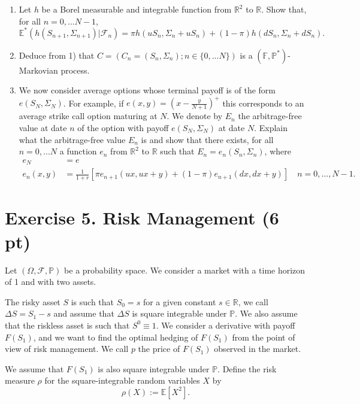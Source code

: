 \documentclass{article}
\begin{document}
\begin{enumerate}
    \item Let $h$ be a Borel measurable and integrable function from $\mathbb{R}^{2}$ to $\mathbb{R}$. Show that, for all $n=0,...N-1$,
    \[ \mathbb{E}^{*}(h(S_{n+1},\Sigma_{n+1})|\mathcal{F}_{n})=\pi h(uS_{n},\Sigma_{n}+uS_{n})+(1-\pi)h(dS_{n},\Sigma_{n}+dS_{n}). \]
    \item Deduce from 1) that $C=(C_{n}=(S_{n},\Sigma_{n});n\in\{0,...N\})$ is a $(\mathbb{F}, \mathbb{P}^{*})$-Markovian process.
    \item We now consider average options whose terminal payoff is of the form $e(S_{N},\Sigma_{N})$. For example, if $e(x,y)=(x-\frac{y}{N+1})^{+}$ this corresponds to an average strike call option maturing at $N$. We denote by $E_{n}$ the arbitrage-free value at date $n$ of the option with payoff $e(S_{N},\Sigma_{N})$ at date $N$. Explain what the arbitrage-free value $E_{n}$ is and show that there exists, for all $n=0,...N$ a function $e_{n}$ from $\mathbb{R}^{2}$ to $\mathbb{R}$ such that $E_{n}=e_{n}(S_{n},\Sigma_{n})$, where
    \begin{align*}
    e_{N} &= e \\
    e_{n}(x,y) &= \frac{1}{1+r}[\pi e_{n+1}(ux,ux+y)+(1-\pi)e_{n+1}(dx,dx+y)] \quad n=0,...,N-1.
    \end{align*}
\end{enumerate}

\section*{Exercise 5. Risk Management (6 pt)}

Let $(\Omega, \mathcal{F}, \mathbb{P})$ be a probability space. We consider a market with a time horizon of 1 and with two assets.

The risky asset $S$ is such that $S_{0}=s$ for a given constant $s\in\mathbb{R}$, we call $\Delta S=S_{1}-s$ and assume that $\Delta S$ is square integrable under $\mathbb{P}$. We also assume that the riskless asset is such that $S^{0}\equiv1$. We consider a derivative with payoff $F(S_{1})$, and we want to find the optimal hedging of $F(S_{1})$ from the point of view of risk management. We call $p$ the price of $F(S_{1})$ observed in the market.

We assume that $F(S_{1})$ is also square integrable under $\mathbb{P}$. Define the risk measure $\rho$ for the square-integrable random variables $X$ by
\[ \rho(X):=\mathbb{E}[X^{2}]. \]
\end{document}
